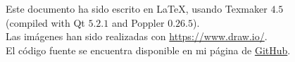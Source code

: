 \vfill
\begin{flushright}
Este documento ha sido escrito en \LaTeX , usando Texmaker $4.5$ \\
(compiled with Qt $5.2.1$ and Poppler $0.26.5$).\\
Las imágenes han sido realizadas con \url{https://www.draw.io/}.\\
El código fuente se encuentra disponible en mi página de \href{https://github.com/davidRetana/TFGLaTeX}{GitHub}.
\end{flushright}

\clearpage
